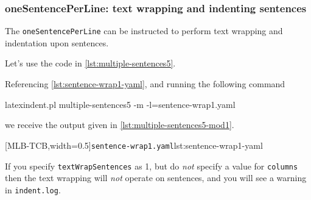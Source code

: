 \subsubsection{oneSentencePerLine: text wrapping and indenting sentences}
 The \texttt{oneSentencePerLine}  can be instructed to perform text wrapping and indentation upon sentences.

 \begin{example}
 Let's use the code in \cref{lst:multiple-sentences5}.


 Referencing \cref{lst:sentence-wrap1-yaml}, and running the following command
  

 \begin{commandshell}
latexindent.pl multiple-sentences5 -m -l=sentence-wrap1.yaml
\end{commandshell}

 we receive the output given in \cref{lst:multiple-sentences5-mod1}.

 \begin{cmhtcbraster}[ raster left skip=-3.5cm,
   raster right skip=-2cm,
   raster force size=false,
   raster column 1/.style={add to width=.1\textwidth},
   raster column skip=.06\linewidth]
  [MLB-TCB,width=0.5\textwidth]{\texttt{sentence-wrap1.yaml}}{lst:sentence-wrap1-yaml}
 \end{cmhtcbraster}
 \end{example}

 If you specify \texttt{textWrapSentences} as 1, but do \emph{not} specify a value for
 \texttt{columns} then the text wrapping will \emph{not} operate on sentences, and you
 will see a warning in \texttt{indent.log}.

